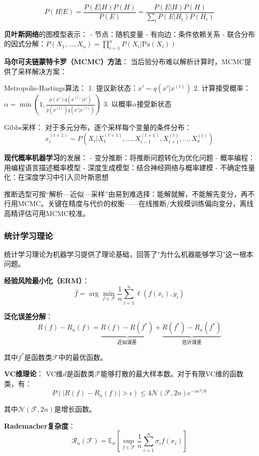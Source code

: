 $$P(H|E) = \frac{P(E|H)P(H)}{P(E)} = \frac{P(E|H)P(H)}{\sum_i P(E|H_i)P(H_i)}$$

\textbf{贝叶斯网络}的图模型表示：
- 节点：随机变量
- 有向边：条件依赖关系
- 联合分布的因式分解：$P(X_1, \ldots, X_n) = \prod_{i=1}^n P(X_i|\text{Pa}(X_i))$

\textbf{马尔可夫链蒙特卡罗（MCMC）方法}：
当后验分布难以解析计算时，MCMC提供了采样解决方案：

Metropolis-Hastings算法：
1. 提议新状态：$x' \sim q(x'|x^{(t)})$
2. 计算接受概率：$\alpha = \min\left(1, \frac{p(x')q(x^{(t)}|x')}{p(x^{(t)})q(x'|x^{(t)})}\right)$
3. 以概率$\alpha$接受新状态

Gibbs采样：
对于多元分布，逐个采样每个变量的条件分布：
$$x_i^{(t+1)} \sim P(X_i|X_1^{(t+1)}, \ldots, X_{i-1}^{(t+1)}, X_{i+1}^{(t)}, \ldots, X_n^{(t)})$$

\textbf{现代概率机器学习}的发展：
- 变分推断：将推断问题转化为优化问题
- 概率编程：用编程语言描述概率模型
- 深度生成模型：结合神经网络与概率建模
- 不确定性量化：在深度学习中引入贝叶斯思想

推断选型可按“解析—近似—采样”由易到难选择：能解就解，不能解先变分，再不行用MCMC。关键在精度与代价的权衡——在线推断/大规模训练偏向变分，离线高精评估可用MCMC校准。

\subsubsection{统计学习理论}

统计学习理论为机器学习提供了理论基础，回答了"为什么机器能够学习"这一根本问题。

\textbf{经验风险最小化（ERM）}：
$$\hat{f} = \arg\min_{f \in \mathcal{F}} \frac{1}{n}\sum_{i=1}^n \ell(f(x_i), y_i)$$

\textbf{泛化误差分解}：
$$R(f) - R_n(f) = \underbrace{R(f) - R(f^*)}_{\text{近似误差}} + \underbrace{R(f^*) - R_n(f^*)}_{\text{估计误差}}$$

其中$f^*$是函数类$\mathcal{F}$中的最优函数。

\textbf{VC维理论}：
VC维$d$是函数类$\mathcal{F}$能够打散的最大样本数。对于有限VC维的函数类，有：
$$P\left(|R(f) - R_n(f)| > \epsilon\right) \leq 4\mathcal{N}(\mathcal{F}, 2n)e^{-n\epsilon^2/8}$$

其中$\mathcal{N}(\mathcal{F}, 2n)$是增长函数。

\textbf{Rademacher复杂度}：
$$\mathcal{R}_n(\mathcal{F}) = \mathbb{E}_{\sigma}\left[\sup_{f \in \mathcal{F}} \frac{1}{n}\sum_{i=1}^n \sigma_i f(x_i)\right]$$

